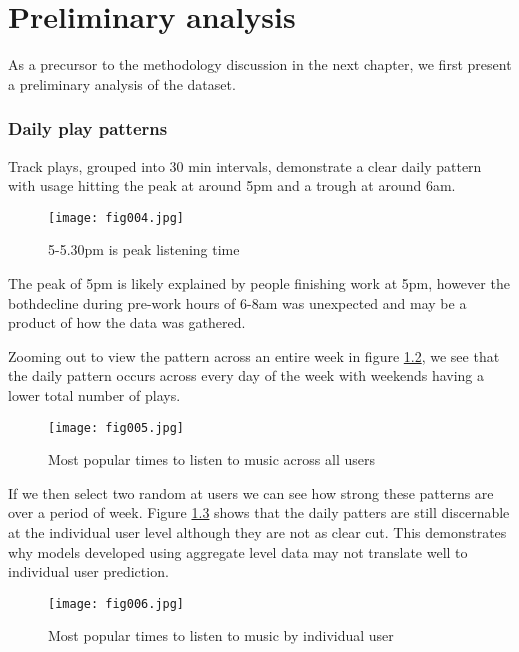 
\chapter{Preliminary analysis} %
\label{Chapter3}
As a precursor to the methodology discussion in the next chapter, we first present a preliminary analysis of the dataset.

\subsection{Daily play patterns}

Track plays, grouped into 30 min intervals, demonstrate a clear daily pattern with usage hitting the peak at around 5pm and a trough at around 6am.

\begin{figure}[h!]
	\centering
	\texttt{[image: fig004.jpg]}
	\caption{5-5.30pm is peak listening time}
	\label{3a}
\end{figure} 

The peak of 5pm is likely explained by people finishing work at 5pm, however the bothdecline during pre-work hours of 6-8am was unexpected and may be a product of how the data was gathered.

Zooming out to view the pattern across an entire week in figure \ref{3b}, we see that the daily pattern occurs across every day of the week with weekends having a lower total number of plays.

\begin{figure}[h!]
	\centering
	\texttt{[image: fig005.jpg]}
	\caption{Most popular times to listen to music across all users}
	\label{3b}
\end{figure} 

If we then select two random at users we can see how strong these patterns are over a period of week. Figure \ref{3c} shows that the daily patters are still discernable at the individual user level although they are not as clear cut. This demonstrates why models developed using aggregate level data may not translate well to individual user prediction. 

\begin{figure}[h!]
	\centering
	\texttt{[image: fig006.jpg]}
	\caption{Most popular times to listen to music by individual user}
	\label{3c}
\end{figure} 

